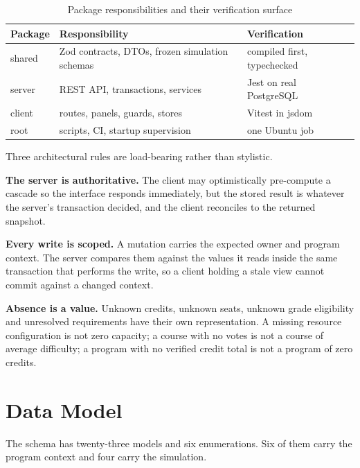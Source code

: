 \begin{table}[h]
\centering
\small
\begin{tabular}{p{}p{}p{}}
\toprule
\textbf{Package} & \textbf{Responsibility} & \textbf{Verification} \\
\midrule
shared & Zod contracts, DTOs, frozen simulation schemas & compiled first, typechecked \\
server & REST API, transactions, services & Jest on real PostgreSQL \\
client & routes, panels, guards, stores & Vitest in jsdom \\
root   & scripts, CI, startup supervision & one Ubuntu job \\
\bottomrule
\end{tabular}
\caption{Package responsibilities and their verification surface}
\end{table}

Three architectural rules are load-bearing rather than stylistic.

\textbf{The server is authoritative.} The client may optimistically pre-compute a cascade so the
interface responds immediately, but the stored result is whatever the server's transaction decided,
and the client reconciles to the returned snapshot.

\textbf{Every write is scoped.} A mutation carries the expected owner and program context. The
server compares them against the values it reads inside the same transaction that performs the
write, so a client holding a stale view cannot commit against a changed context.

\textbf{Absence is a value.} Unknown credits, unknown seats, unknown grade eligibility and
unresolved requirements have their own representation. A missing resource configuration is not zero
capacity; a course with no votes is not a course of average difficulty; a program with no verified
credit total is not a program of zero credits.

\section{Data Model}

The schema has twenty-three models and six enumerations. Six of them carry the program context and
four carry the simulation.

